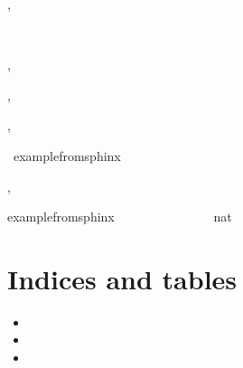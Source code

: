 \documentclass[letterpaper,10pt,english]{sphinxmanual}
\begin{document}
\begin{alectryon}
\begin{sentence}
\begin{output}
\begin{goals}
      \end{goals}
    \end{output}
  \end{sentence}
  \sep
  \begin{sentence}
    \begin{input}
      ~~~\nl
    \end{input}
  \end{sentence}
  \sep
  \begin{sentence}
    \begin{input}
      \nl
    \end{input}
  \end{sentence}
  \sep
  \begin{txt}
    \nl
  \end{txt}
  \sep
  \begin{sentence}
    \begin{input}
      ~example\PYGZus{}from\PYGZus{}sphinx
    \end{input}
    \sep
    \begin{output}
      \begin{messages}
        \begin{message}
          example\PYGZus{}from\PYGZus{}sphinx~~~~~~~~~\nl
          ~~~~~~nat
        \end{message}
      \end{messages}
    \end{output}
  \end{sentence}
\end{alectryon}


\chapter{Indices and tables}
\label{\detokenize{index:indices-and-tables}}\begin{itemize}
\item {} 
\sphinxAtStartPar
{}

\item {} 
\sphinxAtStartPar
{}

\item {} 
\sphinxAtStartPar
{}

\end{itemize}



\renewcommand{\indexname}{Index}
\printindex
\end{document}
